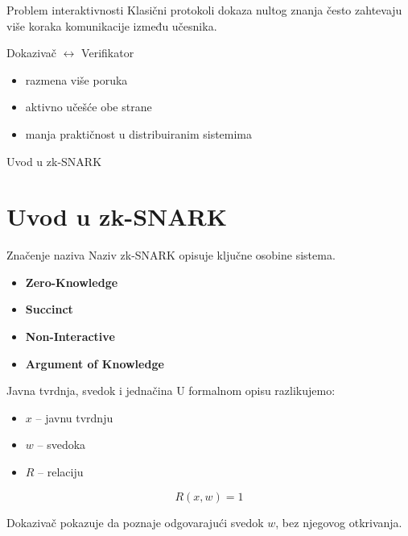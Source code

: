 \documentclass[aspectratio=1610]{beamer}
\begin{document}
\begin{frame}{Problem interaktivnosti}
Klasični protokoli dokaza nultog znanja često zahtevaju više koraka komunikacije između učesnika.

\bigskip

\begin{center}
Dokazivač \(\longleftrightarrow\) Verifikator
\end{center}

\bigskip

\begin{itemize}
    \item razmena više poruka
    \item aktivno učešće obe strane
    \item manja praktičnost u distribuiranim sistemima
\end{itemize}
\end{frame}

\begin{frame}
\centering
\vfill

{\Huge Uvod u zk-SNARK}

\vfill
\end{frame}

\section{Uvod u zk-SNARK}

\begin{frame}{Značenje naziva}
Naziv zk-SNARK opisuje ključne osobine sistema.

\bigskip

\begin{itemize}
    \item \textbf{Zero-Knowledge}
    \item \textbf{Succinct}
    \item \textbf{Non-Interactive}
    \item \textbf{Argument of Knowledge}
\end{itemize}

\bigskip
\end{frame}

\begin{frame}{Javna tvrdnja, svedok i jednačina}
U formalnom opisu razlikujemo:

\bigskip

\begin{itemize}
    \item \(x\) -- javnu tvrdnju
    \item \(w\) -- svedoka
    \item \(R\) -- relaciju
\end{itemize}

\bigskip

\[
R(x,w)=1
\]

\bigskip

Dokazivač pokazuje da poznaje odgovarajući svedok \(w\), bez njegovog otkrivanja.
\end{frame}
\end{document}
